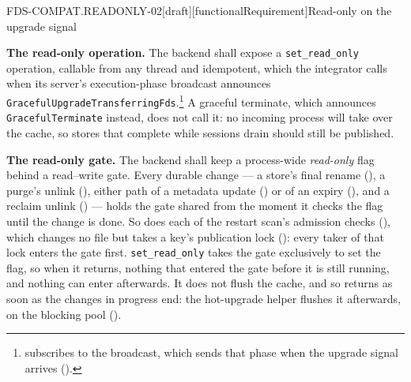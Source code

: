 \begin{requirement}{FDS-COMPAT.READONLY-02}[draft][functionalRequirement]{Read-only on the upgrade signal}


  \textbf{The read-only operation.} The backend shall expose a
  \texttt{set\_read\_only} operation, callable from any thread and
  idempotent, which the integrator calls when its server's execution-phase
  broadcast announces
  \texttt{GracefulUpgradeTransferringFds}.\footnote{
  subscribes to the broadcast, which sends that phase when the upgrade signal
  arrives ().} A graceful
  terminate, which announces \texttt{GracefulTerminate} instead, does not
  call it: no incoming process will take over the cache, so stores that
  complete while sessions drain should still be published.

  \textbf{The read-only gate.} The backend shall keep a process-wide
  \emph{read-only} flag behind a read--write gate. Every durable change ---
  a store's final rename (), a purge's unlink
  (), either path of a metadata update
  () or of an expiry
  (), and a reclaim unlink
  () --- holds the gate shared from the moment
  it checks the flag until the change is done. So does each of the restart
  scan's admission checks (), which changes
  no file but takes a key's publication lock
  (): every taker of that lock enters the
  gate first. \texttt{set\_read\_only} takes the gate exclusively to set the
  flag, so when it returns, nothing that entered the gate before it is still
  running, and nothing can enter afterwards. It does not flush the cache,
  and so returns as soon as the changes in progress end: the hot-upgrade
  helper flushes it afterwards, on the blocking pool
  ().


\end{requirement}
